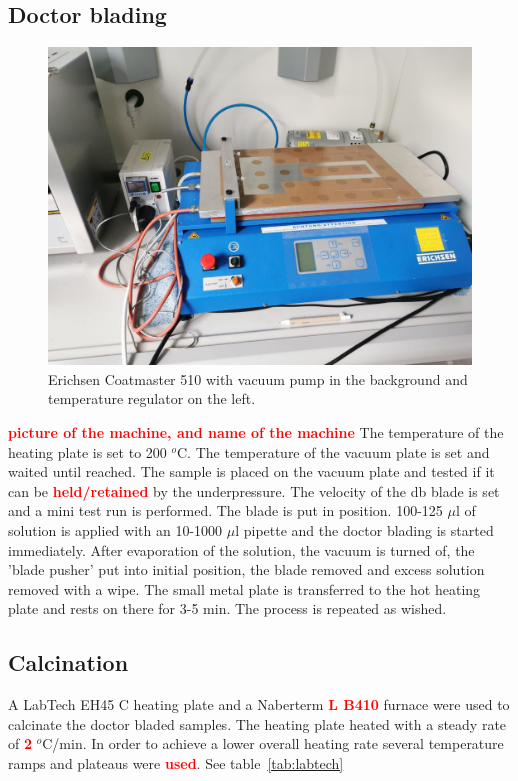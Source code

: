 \documentclass[a4paper]{article}
\newcommand{\todo}[1]{\textbf{\textcolor{red}{#1}}}
\newcommand{\td}[1]{\textbf{\textcolor{red}{#1}}}
\begin{document}
\subsection{Doctor blading}
\label{sec:DB}
\begin{figure}
	\centering
	\includegraphics[width=.8\textwidth]{Pics/erichsen.png}
	\caption{Erichsen Coatmaster 510 
		with vacuum pump in the background and temperature regulator on the left.}
	\label{fig:eric}
\end{figure}
\td{picture of the machine, and name of the machine}
The temperature of the heating plate is set to 200 $^o$C.
The temperature of the vacuum plate is set and waited until reached.
The sample is placed on the vacuum plate and tested if it can be \td{held/retained} by the underpressure.
The velocity of the \gls{db} blade is set and a mini test run is performed. 
The blade is put in position. 
100-125 $\mu$l of solution is applied with an 10-1000 $\mu$l pipette and the doctor blading is started immediately. 
After evaporation of the solution, the vacuum is turned of, the 'blade pusher' put into initial position, the blade removed and excess solution removed with a wipe. 
The small metal plate is transferred to the hot heating plate and rests on there for 3-5 min. 
The process is repeated as wished. 

\subsection{Calcination}
A LabTech EH45 C heating plate and a Naberterm \td{L B410} furnace were used to calcinate the doctor bladed samples. 
The heating plate heated with a steady rate of \td{2} $^o$C/min. 
In order to achieve a lower overall heating rate several temperature ramps and plateaus were \todo{used}. See table~\ref{tab:labtech}
\end{document}
